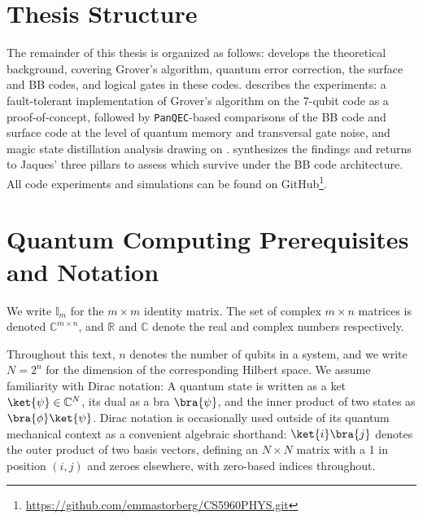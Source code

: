 

\section{Thesis Structure}\label{sec:structure}

The remainder of this thesis is organized as follows:  develops the theoretical background, covering Grover's algorithm, quantum error correction, the surface and BB codes, and logical gates in these codes.  describes the experiments: a fault-tolerant implementation of Grover's algorithm on the 7-qubit code as a proof-of-concept, followed by \texttt{PanQEC}-based comparisons of the BB code and surface code at the level of quantum memory and transversal gate noise, and magic state distillation analysis drawing on \textcite{Xu_2026}.  synthesizes the findings and returns to Jaques' three pillars to assess which survive under the BB code architecture. All code experiments and simulations can be found on GitHub\footnote{\url{https://github.com/emmastorberg/CS5960PHYS.git}}.


\section{Quantum Computing Prerequisites and Notation}\label{sec:prerequisites}
We write $\mathbb{I}_m$ for the $m \times m$ identity matrix. The set of complex $m \times n$ matrices is denoted $\mathbb{C}^{m \times n}$, and $\mathbb{R}$ and $\mathbb{C}$ denote the real and complex numbers respectively.

Throughout this text, $n$ denotes the number of qubits in a system, and we write $N = 2^n$ for the dimension of the corresponding Hilbert space. We assume familiarity with Dirac notation: A quantum state is written as a ket $\ket{\psi} \in \mathbb{C}^N$, its dual as a bra $\bra{\psi}$, and the inner product of two states as $\bra{\phi}\ket{\psi}$. Dirac notation is occasionally used outside of its quantum mechanical context as a 
convenient algebraic shorthand: $\ket{i}\bra{j}$ denotes the outer product of two basis vectors, defining an $N \times N$ matrix with a 1 in position $(i,j)$ and zeroes elsewhere, with zero-based indices throughout.

